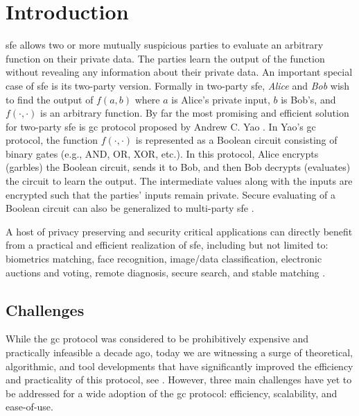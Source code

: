 \chapter{Introduction}
\acrfull{sfe} allows two or more mutually suspicious parties to evaluate an arbitrary function on their private data.
The parties learn the output of the function without revealing any information about their private data.
An important special case of \acrshort{sfe} is its two-party version.
Formally in two-party \acrshort{sfe}, \textit{Alice} and \textit{Bob} wish to find the output of $f(a, b)$ where $a$ is Alice's private input, $b$ is Bob's, and $f(\cdot,\cdot)$ is an arbitrary function.
By far the most promising and efficient solution for two-party \acrshort{sfe} is \acrfull{gc} protocol proposed by Andrew C. Yao \cite{yao1986generate}.
In Yao's \acrshort{gc} protocol, the function $f(\cdot,\cdot)$ is represented as a Boolean circuit consisting of binary gates (e.g., AND, OR, XOR, etc.).
In this protocol, Alice encrypts (garbles) the Boolean circuit, sends it to Bob, and then Bob decrypts (evaluates) the circuit to learn the output.
The intermediate values along with the inputs are encrypted such that the parties' inputs remain private.
Secure evaluating of a Boolean circuit can also be generalized to multi-party \acrshort{sfe} \cite{goldreich1987play, ben2008fairplaymp}.

A host of privacy preserving and security critical applications can directly benefit from a practical and efficient realization of \acrshort{sfe}, including but not limited to: biometrics matching, face recognition, image/data classification, electronic auctions and voting, remote diagnosis, secure search, and stable matching \cite{riazi2017toward, zhang2016robust, bringer2013privacy, evans2011efficient, barni2009secure, naor1999privacy, brickell2007privacy, jha2008towards}.

\section{Challenges}
While the \acrshort{gc} protocol was considered to be prohibitively expensive and practically infeasible a decade ago, today we are witnessing a surge of theoretical, algorithmic, and tool developments that have significantly improved the efficiency and practicality of this protocol, see \cite{malkhi2004fairplay, kolesnikov2008improved, pinkas2009secure, huang2011faster, bellare2013efficient, zahur2015two, zahur2015obliv, liu2015oblivm}.
However, three main challenges have yet to be addressed for a wide adoption of the \acrshort{gc} protocol: efficiency, scalability, and ease-of-use.

